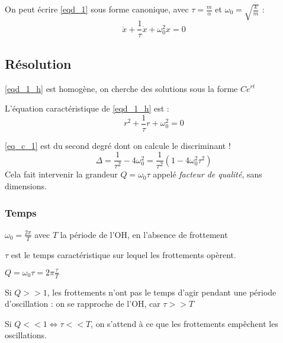 \documentclass[french]{yLectureNote}
\begin{document}
On peut écrire \eqref{eqd_1} sous forme canonique, avec $\tau = \frac{m}{\alpha}$ et $\omega_0 = \sqrt{\frac{k}{m}}$ :
\begin{equation}\ddot{x} + \frac{1}{\tau}\dot{x} + \omega_0^2x = 0\label{eqd_1_h}\end{equation}

\subsection{Résolution}
\eqref{eqd_1_h} est homogène, on cherche des solutions sous la forme $Ce^{rt}$

L'équation caractéristique de \eqref{eqd_1_h} est : \begin{equation}r^2 + \frac{1}{\tau}r + \omega_0^2 = 0\label{eq_c_1}\end{equation}

\eqref{eq_c_1} est du second degré dont on calcule le discriminant ! \begin{equation}\Delta = \frac{1}{\tau^2} - 4\omega_0^2 = \frac{1}{\tau^2}(1-4\omega_0^2\tau^2)\label{delta}\end{equation} Cela fait intervenir la grandeur $Q = \omega_0\tau$ appelé \emph{facteur de qualité}, sans dimensions.
\subsubsection{Temps}
$\omega_0 = \frac{2\pi}{T}$ avec $T$ la période de l'OH, en l'absence de frottement

$\tau$ est le temps caractéristique sur lequel les frottements opèrent.

$Q = \omega_0\tau = 2\pi\frac{\tau}{T}$

Si $Q>> 1$, les frottements n'ont pas le temps d'agir pendant une période d'oscillation : on se rapproche de l'OH, car $\tau >> T$

Si $Q<<1 \iff \tau << T$, on s'attend à ce que les frottements emp\^echent les oscillations.
\end{document}
